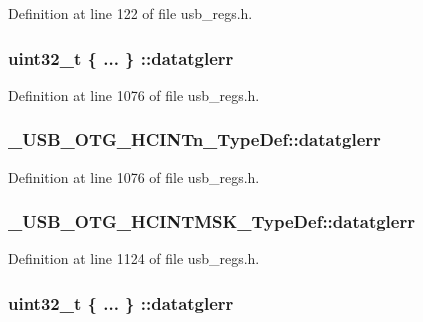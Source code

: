 Definition at line 122 of file usb\-\_\-regs.\-h.

\hypertarget{group___u_s_b___o_t_g___d_r_i_v_e_r_ga762d40634683566eb3e42128b42c6eec}{
\subsubsection[{datatglerr}]{\setlength{\rightskip}{0pt plus 5cm}uint32\-\_\-t \{ ... \} \-::datatglerr}}\label{group___u_s_b___o_t_g___d_r_i_v_e_r_ga762d40634683566eb3e42128b42c6eec}


Definition at line 1076 of file usb\-\_\-regs.\-h.

\hypertarget{group___u_s_b___o_t_g___d_r_i_v_e_r_ga621d2d8b151d63f3ae5906c73e185750}{
\subsubsection[{datatglerr}]{ \-\_\-\-U\-S\-B\-\_\-\-O\-T\-G\-\_\-\-H\-C\-I\-N\-Tn\-\_\-\-Type\-Def\-::datatglerr}}\label{group___u_s_b___o_t_g___d_r_i_v_e_r_ga621d2d8b151d63f3ae5906c73e185750}


Definition at line 1076 of file usb\-\_\-regs.\-h.

\hypertarget{group___u_s_b___o_t_g___d_r_i_v_e_r_gac87753918aa4ff268f9e7ce0a32fb9f0}{
\subsubsection[{datatglerr}]{ \-\_\-\-U\-S\-B\-\_\-\-O\-T\-G\-\_\-\-H\-C\-I\-N\-T\-M\-S\-K\-\_\-\-Type\-Def\-::datatglerr}}\label{group___u_s_b___o_t_g___d_r_i_v_e_r_gac87753918aa4ff268f9e7ce0a32fb9f0}


Definition at line 1124 of file usb\-\_\-regs.\-h.

\hypertarget{group___u_s_b___o_t_g___d_r_i_v_e_r_gae7c661c2d4d8d8487e85bb052fb8fca6}{
\subsubsection[{datatglerr}]{\setlength{\rightskip}{0pt plus 5cm}uint32\-\_\-t \{ ... \} \-::datatglerr}}\label{group___u_s_b___o_t_g___d_r_i_v_e_r_gae7c661c2d4d8d8487e85bb052fb8fca6}


